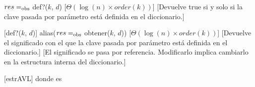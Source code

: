 \begin{Interfaz}
    {$res =_{\mathrm{obs}}$ def?($k$, $d$)}
    [$\Theta(\log(n) \times order(k))$]
    [Devuelve true si y solo si la clave pasada por par\'ametro est\'a definida en el diccionario.]

    [def?($k$, $d$)]
    {alias($res =_{\mathrm{obs}}$ obtener($k$, $d$))}
    [$\Theta(\log(n) \times order(k))$]
    [Devuelve el significado con el que la clave pasada por par\'ametro est\'a definida en el diccionario.]
    [El significado se pasa por referencia. Modificarlo implica cambiarlo en la estructura interna del diccionario.]

\end{Interfaz}

\begin{Representacion}

  \begin{Estructura}{\diccLogKS}[estrAVL]
    \hspace*{3mm}donde  es 
  \end{Estructura} 


\end{Representacion}
